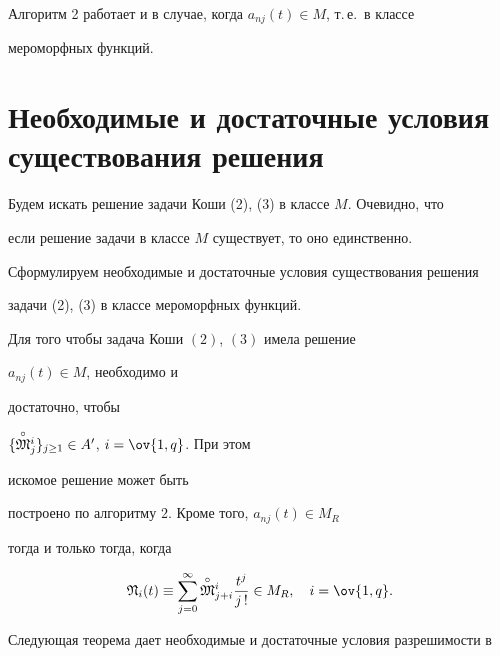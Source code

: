  


\begin{notenonum} 


Алгоритм 2 работает и в случае, когда $a_{nj}(t)\in M$, т.\,е.~в классе 


мероморфных функций. 


\end{notenonum} 


 


\section{Необходимые и достаточные условия существования решения} 


 


Будем искать решение задачи Коши (2), (3) в классе $M$. Очевидно, что 


если решение задачи в классе $M$ существует, то оно единственно. 


Сформулируем необходимые и достаточные условия существования решения 


задачи (2), (3) в классе мероморфных функций. 


 


\begin{thm} 


Для того чтобы задача Коши $(2)$, $(3)$ имела решение 


$a_{nj}(t)\in M$, необходимо и 


достаточно, чтобы 


$\{\overset{\circ}{\frak M}{}^i_j\}_{j\ge 1}\in A'$, $i=\ov{1,q}$. При этом 


искомое решение может быть 


построено по алгоритму $2$. Кроме того, $a_{nj}(t)\in M_R$ 


тогда и только тогда, когда 


$$ 


\frak N_i(t)\equiv\sum^\infty_{j=0} 


\up{\circ}{\frak M}^i_{j+i}\frac{t^j}{j\,!}\in M_R,\quad 


i=\ov{1,q}. 


$$ 


\end{thm} 


 


Следующая теорема дает необходимые и достаточные условия разрешимости в 


